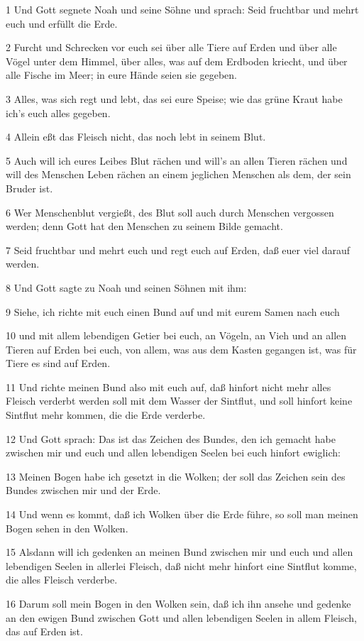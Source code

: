 \par 1 Und Gott segnete Noah und seine Söhne und sprach: Seid fruchtbar und mehrt euch und erfüllt die Erde.
\par 2 Furcht und Schrecken vor euch sei über alle Tiere auf Erden und über alle Vögel unter dem Himmel, über alles, was auf dem Erdboden kriecht, und über alle Fische im Meer; in eure Hände seien sie gegeben.
\par 3 Alles, was sich regt und lebt, das sei eure Speise; wie das grüne Kraut habe ich's euch alles gegeben.
\par 4 Allein eßt das Fleisch nicht, das noch lebt in seinem Blut.
\par 5 Auch will ich eures Leibes Blut rächen und will's an allen Tieren rächen und will des Menschen Leben rächen an einem jeglichen Menschen als dem, der sein Bruder ist.
\par 6 Wer Menschenblut vergießt, des Blut soll auch durch Menschen vergossen werden; denn Gott hat den Menschen zu seinem Bilde gemacht.
\par 7 Seid fruchtbar und mehrt euch und regt euch auf Erden, daß euer viel darauf werden.
\par 8 Und Gott sagte zu Noah und seinen Söhnen mit ihm:
\par 9 Siehe, ich richte mit euch einen Bund auf und mit eurem Samen nach euch
\par 10 und mit allem lebendigen Getier bei euch, an Vögeln, an Vieh und an allen Tieren auf Erden bei euch, von allem, was aus dem Kasten gegangen ist, was für Tiere es sind auf Erden.
\par 11 Und richte meinen Bund also mit euch auf, daß hinfort nicht mehr alles Fleisch verderbt werden soll mit dem Wasser der Sintflut, und soll hinfort keine Sintflut mehr kommen, die die Erde verderbe.
\par 12 Und Gott sprach: Das ist das Zeichen des Bundes, den ich gemacht habe zwischen mir und euch und allen lebendigen Seelen bei euch hinfort ewiglich:
\par 13 Meinen Bogen habe ich gesetzt in die Wolken; der soll das Zeichen sein des Bundes zwischen mir und der Erde.
\par 14 Und wenn es kommt, daß ich Wolken über die Erde führe, so soll man meinen Bogen sehen in den Wolken.
\par 15 Alsdann will ich gedenken an meinen Bund zwischen mir und euch und allen lebendigen Seelen in allerlei Fleisch, daß nicht mehr hinfort eine Sintflut komme, die alles Fleisch verderbe.
\par 16 Darum soll mein Bogen in den Wolken sein, daß ich ihn ansehe und gedenke an den ewigen Bund zwischen Gott und allen lebendigen Seelen in allem Fleisch, das auf Erden ist.
